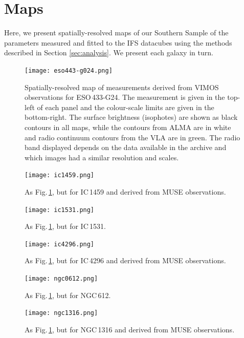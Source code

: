 \documentclass[a4paper,fleqn,usenatbib]{mnras}
\begin{document}
\section{Maps}
	\label{sec:maps}

	Here, we present spatially-resolved maps of our Southern Sample of the parameters measured and fitted to the IFS datacubes using the methods described in Section \ref{sec:analysis}. We present each galaxy in turn.

	\begin{figure}
		\centering
		\texttt{[image: eso443-g024.png]}
		\caption{Spatially-resolved map of measurements derived from VIMOS observations for ESO\,433-G24. The measurement is given in the top-left of each panel and the colour-scale limits are given in the bottom-right. The surface brightness (isophotes) are shown as black contours in all maps, while the  contours from ALMA are in white and radio continuum contours from the VLA are in green. The radio band displayed depends on the data available in the archive and which images had a similar resolution and scales.}
		\label{fig:eso443}
	\end{figure}

	\begin{figure}
		\centering
		\texttt{[image: ic1459.png]}
		\caption{As Fig.\,\ref{fig:eso443}, but for IC\,1459 and derived from MUSE observations.}
		\label{fig:ic1459}
	\end{figure}

	\begin{figure}
		\centering
		\texttt{[image: ic1531.png]}
		\caption{As Fig.\,\ref{fig:eso443}, but for IC\,1531.}
		\label{fig:ic1531}
	\end{figure}

	\begin{figure}
		\centering
		\texttt{[image: ic4296.png]}
		\caption{As Fig.\,\ref{fig:eso443}, but for IC\,4296 and derived from MUSE observations.}
		\label{fig:ic4296}
	\end{figure}

	\begin{figure}
		\centering
		\texttt{[image: ngc0612.png]}
		\caption{As Fig.\,\ref{fig:eso443}, but for NGC\,612.}
		\label{fig:ngc612}
	\end{figure}

	\begin{figure}
		\centering
		\texttt{[image: ngc1316.png]}
		\caption{As Fig.\,\ref{fig:eso443}, but for NGC\,1316 and derived from MUSE observations.}
		\label{fig:ngc1316}
	\end{figure}
\end{document}
